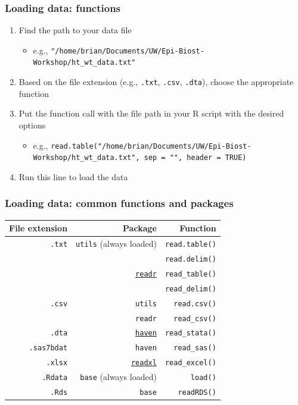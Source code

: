 \documentclass[11pt]{beamer}
\newcommand{\myframe}[1]{\begin{frame} \frametitle{#1}}
\begin{document}
\myframe{Loading data: functions}
\begin{enumerate}
\item Find the path to your data file 
\begin{itemize}
\item {\scriptsize e.g., \texttt{"/home/brian/Documents/UW/Epi-Biost-Workshop/ht\_wt\_data.txt"} }
\end{itemize}
\item Based on the file extension (e.g., \texttt{.txt}, \texttt{.csv}, \texttt{.dta}), choose the appropriate function
\item Put the function call with the file path in your R script with the desired options
\begin{itemize}
\item {\tiny e.g., \texttt{read.table("/home/brian/Documents/UW/Epi-Biost-Workshop/ht\_wt\_data.txt", sep = "", header = TRUE)} }
\end{itemize}
\item Run this line to load the data
\end{enumerate}
\end{frame}

\myframe{Loading data: common functions and packages}
\begin{tabular}{rrr}
File extension & Package & Function \\
\hline 
\texttt{.txt} & \texttt{utils} (always loaded)  & \texttt{read.table()} \\
              &                & \texttt{read.delim()} \\
              & \href{http://readr.tidyverse.org/}{\texttt{readr}} & \texttt{read\_table()} \\
              &                & \texttt{read\_delim()} \\
\texttt{.csv} & \texttt{utils}  & \texttt{read.csv()} \\
              & \texttt{readr} & \texttt{read\_csv()} \\
\texttt{.dta} & \href{http://haven.tidyverse.org/}{\texttt{haven}} & \texttt{read\_stata()} \\
\texttt{.sas7bdat} & \texttt{haven} & \texttt{read\_sas()} \\
\texttt{.xlsx} & \href{http://readxl.tidyverse.org/}{\texttt{readxl}} & \texttt{read\_excel()} \\
\texttt{.Rdata} & \texttt{base} (always loaded) & \texttt{load()} \\
\texttt{.Rds} & \texttt{base} & \texttt{readRDS()} \\
\hline
\end{tabular}
\end{frame}
\end{document}
